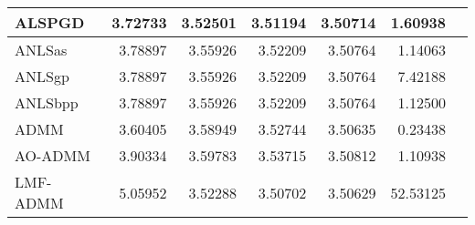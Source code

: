 \documentclass{article}
\begin{document}
\begin{table}[H]
\begin{tabular}{|l|r|r|r|r|r|l|}
		ALSPGD   & 3.72733                 & 3.52501                 & 3.51194                  & 3.50714                  & 1.60938                      &  \\ \hline
		ANLSas   & 3.78897                 & 3.55926                 & 3.52209                  & 3.50764                  & 1.14063                      &  \\ \hline
		ANLSgp   & 3.78897                 & 3.55926                 & 3.52209                  & 3.50764                  & 7.42188                      &  \\ \hline
		ANLSbpp  & 3.78897                 & 3.55926                 & 3.52209                  & 3.50764                  & 1.12500                      &  \\ \hline
		ADMM     & 3.60405                 & 3.58949                 & 3.52744                  & 3.50635                  & 0.23438                      &  \\ \hline
		AO-ADMM  & 3.90334                 & 3.59783                 & 3.53715                  & 3.50812                  & 1.10938                      &  \\ \hline
		LMF-ADMM & 5.05952                 & 3.52288                 & 3.50702                  & 3.50629                  & 52.53125                     &  \\ \hline
	\end{tabular}
\end{table}
\end{document}
